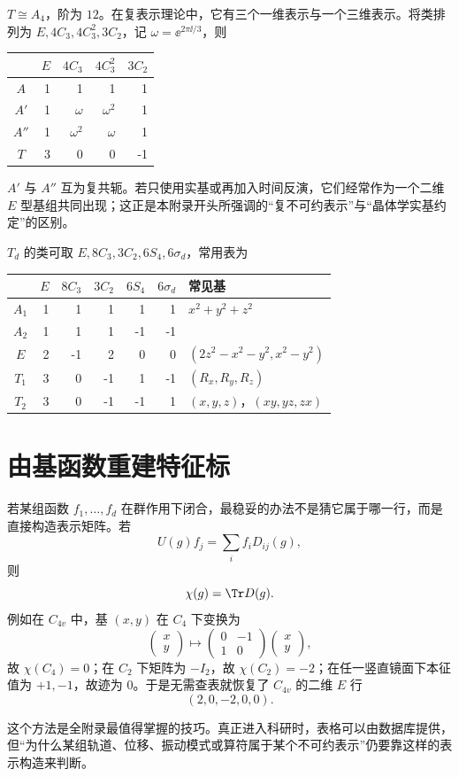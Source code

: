 $T\cong A_4$，阶为 $12$。在复表示理论中，它有三个一维表示与一个三维表示。将类排列为 $E,4C_3,4C_3^2,3C_2$，记 $\omega=\ee^{2\pi\ii/3}$，则
\begin{center}
\begin{tabular}{c|rrrr}
\toprule
 & $E$ & $4C_3$ & $4C_3^2$ & $3C_2$\\
\midrule
$A$   &1&1&1&1\\
$A'$  &1&$\omega$&$\omega^2$&1\\
$A''$ &1&$\omega^2$&$\omega$&1\\
$T$   &3&0&0&-1\\
\bottomrule
\end{tabular}
\end{center}
$A'$ 与 $A''$ 互为复共轭。若只使用实基或再加入时间反演，它们经常作为一个二维 $E$ 型基组共同出现；这正是本附录开头所强调的“复不可约表示”与“晶体学实基约定”的区别。

$T_d$ 的类可取 $E,8C_3,3C_2,6S_4,6\sigma_d$，常用表为
\begin{center}
\begin{tabular}{c|rrrrr|l}
\toprule
 & $E$&$8C_3$&$3C_2$&$6S_4$&$6\sigma_d$&常见基\\
\midrule
$A_1$&1&1&1&1&1&$x^2+y^2+z^2$\\
$A_2$&1&1&1&-1&-1&\\
$E$&2&-1&2&0&0&$(2z^2-x^2-y^2,x^2-y^2)$\\
$T_1$&3&0&-1&1&-1&$(R_x,R_y,R_z)$\\
$T_2$&3&0&-1&-1&1&$(x,y,z)$，$(xy,yz,zx)$\\
\bottomrule
\end{tabular}
\end{center}

\section{由基函数重建特征标}

若某组函数 $f_1,\dots,f_d$ 在群作用下闭合，最稳妥的办法不是猜它属于哪一行，而是直接构造表示矩阵。若
\[
U(g)f_j=\sum_i f_i D_{ij}(g),
\]
则
\[
\chi(g)=\Tr D(g).
\]
例如在 $C_{4v}$ 中，基 $(x,y)$ 在 $C_4$ 下变换为
\[
\begin{pmatrix}x\\y\end{pmatrix}
\mapsto
\begin{pmatrix}0&-1\\1&0\end{pmatrix}
\begin{pmatrix}x\\y\end{pmatrix},
\]
故 $\chi(C_4)=0$；在 $C_2$ 下矩阵为 $-I_2$，故 $\chi(C_2)=-2$；在任一竖直镜面下本征值为 $+1,-1$，故迹为 $0$。于是无需查表就恢复了 $C_{4v}$ 的二维 $E$ 行
\[
(2,0,-2,0,0).
\]

这个方法是全附录最值得掌握的技巧。真正进入科研时，表格可以由数据库提供，但“为什么某组轨道、位移、振动模式或算符属于某个不可约表示”仍要靠这样的表示构造来判断。
